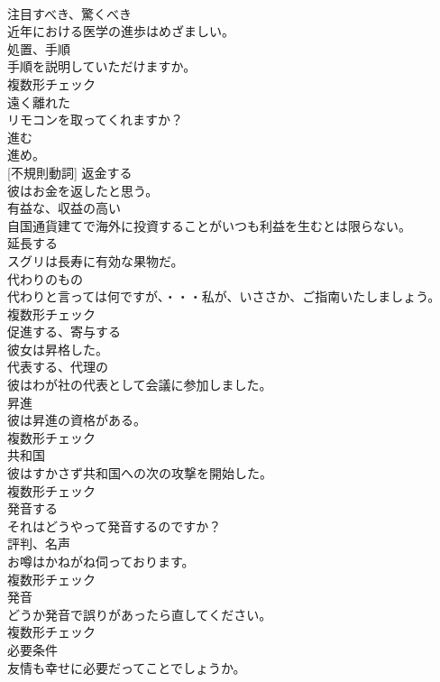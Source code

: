 \documentclass[8pt]{extreport}
\begin{document}
\begin{CJK}{UTF8}{min}
\\	[形容詞]	注目すべき、驚くべき	
\\	近年における医学の進歩はめざましい。	
\\	[名詞]	処置、手順	
\\	手順を説明していただけますか。	
\\	複数形チェック
\\	[形容詞]	遠く離れた	
\\	リモコンを取ってくれますか？	
\\	[動詞]	進む	
\\	進め。	
\\	[動詞] [不規則動詞]	返金する	
\\	彼はお金を返したと思う。	
\\	[形容詞]	有益な、収益の高い	
\\	自国通貨建てで海外に投資することがいつも利益を生むとは限らない。	
\\	[動詞]	延⻑する	
\\	スグリは長寿に有効な果物だ。	
\\	[名詞]	代わりのもの	
\\	代わりと言っては何ですが、・・・私が、いささか、ご指南いたしましょう。	
\\	複数形チェック
\\	[動詞]	促進する、寄与する	
\\	彼女は昇格した。	
\\	[形容詞]	代表する、代理の	
\\	彼はわが社の代表として会議に参加しました。	
\\	[名詞]	昇進	
\\	彼は昇進の資格がある。	
\\	複数形チェック
\\	[名詞]	共和国	
\\	彼はすかさず共和国への次の攻撃を開始した。	
\\	複数形チェック
\\	[動詞]	発音する	
\\	それはどうやって発音するのですか？	
\\	[名詞]	評判、名声	
\\	お噂はかねがね伺っております。	
\\	複数形チェック
\\	[名詞]	発音	
\\	どうか発音で誤りがあったら直してください。	
\\	複数形チェック
\\	[名詞]	必要条件	
\\	友情も幸せに必要だってことでしょうか。	

\end{CJK}
\end{document}
